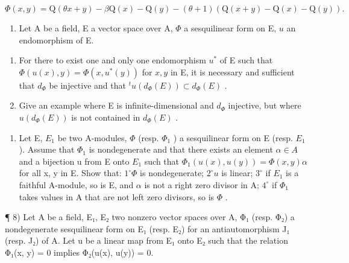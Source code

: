 \[
\Phi (x, y) = \mathrm{Q} (\theta x + y) - \beta \mathrm{Q} (x) - \mathrm{Q} (y) - (\theta + 1) (\mathrm{Q} (x + y) - \mathrm{Q} (x) - \mathrm{Q} (y)).
\]

\begin{enumerate}
\def\labelenumi{\arabic{enumi})}
\setcounter{enumi}{5}
\tightlist
\item
  Let A be a field, E a vector space over A, \(\Phi\) a sesquilinear form on E, \(u\) an endomorphism of E.
\end{enumerate}

\begin{enumerate}
\def\labelenumi{\alph{enumi})}
\item
  For there to exist one and only one endomorphism \(u^*\) of E such that \(\Phi(u(x), y) = \Phi(x, u^*(y))\) for \(x, y\) in E, it is necessary and sufficient that \(d_\Phi\) be injective and that \(^t u(d_\Phi(E)) \subset d_\Phi(E)\) .
\item
  Give an example where E is infinite-dimensional and \(d_{\Phi}\) injective, but where \(u(d_{\Phi}(E))\) is not contained in \(d_{\Phi}(E)\) .
\end{enumerate}

\begin{enumerate}
\def\labelenumi{\arabic{enumi})}
\setcounter{enumi}{6}
\tightlist
\item
  Let E, \(E_{1}\) be two A-modules, \(\Phi\) (resp. \(\Phi_{1}\) ) a sesquilinear form on E (resp. \(E_{1}\) ). Assume that \(\Phi_{1}\) is nondegenerate and that there exists an element \(\alpha\in A\) and a bijection u from E onto \(E_{1}\) such that \(\Phi_{1}(u(x), u(y))=\Phi(x,y)\alpha\) for all x, y in E. Show that: \(1^{\circ}\Phi\) is nondegenerate; \(2^{\circ}u\) is linear; \(3^{\circ}\) if \(E_{1}\) is a faithful A-module, so is E, and \(\alpha\) is not a right zero divisor in A; \(4^{\circ}\) if \(\Phi_{1}\) takes values in A that are not left zero divisors, so is \(\Phi\) .
\end{enumerate}

¶ 8) Let A be a field, E₁, E₂ two nonzero vector spaces over A, Φ₁ (resp. Φ₂) a nondegenerate sesquilinear form on E₁ (resp. E₂) for an antiautomorphism J₁ (resp. J₂) of A. Let u be a linear map from E₁ onto E₂ such that the relation Φ₁(x, y) = 0 implies Φ₂(u(x), u(y)) = 0.

